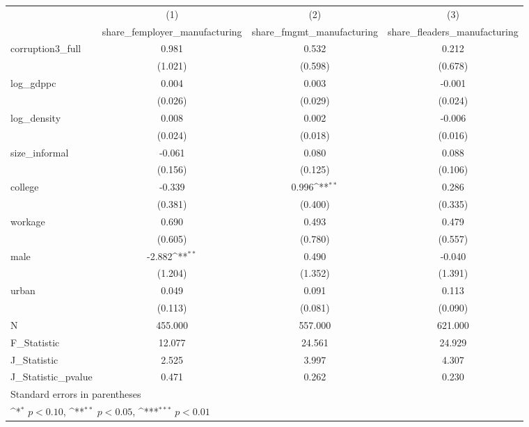 {
\def\sym#1{\ifmmode^{#1}\else\(^{#1}\)\fi}
\begin{tabular}{l*{3}{c}}
\hline\hline
            &\multicolumn{1}{c}{(1)}&\multicolumn{1}{c}{(2)}&\multicolumn{1}{c}{(3)}\\
            &\multicolumn{1}{c}{share\_femployer\_manufacturing}&\multicolumn{1}{c}{share\_fmgmt\_manufacturing}&\multicolumn{1}{c}{share\_fleaders\_manufacturing}\\
\hline
corruption3\_full&       0.981         &       0.532         &       0.212         \\
            &     (1.021)         &     (0.598)         &     (0.678)         \\
[1em]
log\_gdppc   &       0.004         &       0.003         &      -0.001         \\
            &     (0.026)         &     (0.029)         &     (0.024)         \\
[1em]
log\_density &       0.008         &       0.002         &      -0.006         \\
            &     (0.024)         &     (0.018)         &     (0.016)         \\
[1em]
size\_informal&      -0.061         &       0.080         &       0.088         \\
            &     (0.156)         &     (0.125)         &     (0.106)         \\
[1em]
college     &      -0.339         &       0.996\sym{**} &       0.286         \\
            &     (0.381)         &     (0.400)         &     (0.335)         \\
[1em]
workage     &       0.690         &       0.493         &       0.479         \\
            &     (0.605)         &     (0.780)         &     (0.557)         \\
[1em]
male        &      -2.882\sym{**} &       0.490         &      -0.040         \\
            &     (1.204)         &     (1.352)         &     (1.391)         \\
[1em]
urban       &       0.049         &       0.091         &       0.113         \\
            &     (0.113)         &     (0.081)         &     (0.090)         \\
\hline
N           &     455.000         &     557.000         &     621.000         \\
F\_Statistic &      12.077         &      24.561         &      24.929         \\
J\_Statistic &       2.525         &       3.997         &       4.307         \\
J\_Statistic\_pvalue&       0.471         &       0.262         &       0.230         \\
\hline\hline
\multicolumn{4}{l}{\footnotesize Standard errors in parentheses}\\
\multicolumn{4}{l}{\footnotesize \sym{*} \(p<0.10\), \sym{**} \(p<0.05\), \sym{***} \(p<0.01\)}\\
\end{tabular}
}
